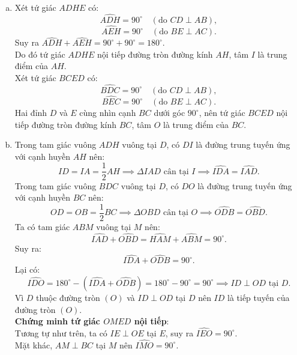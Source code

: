 \begin{bt}
{\begin{center}
	\end{center}
	\begin{enumerate}[a)]
		\item Xét tứ giác $ADHE$ có:
		$$\widehat{ADH} = 90^\circ \quad (\text{do } CD \perp AB),$$
		$$\widehat{AEH} = 90^\circ \quad (\text{do } BE \perp AC).$$
		Suy ra $\widehat{ADH} + \widehat{AEH} = 90^\circ + 90^\circ = 180^\circ$.\\
		Do đó tứ giác $ADHE$ nội tiếp đường tròn đường kính $AH$, tâm $I$ là trung điểm của $AH$.\\
		Xét tứ giác $BCED$ có:
		$$\widehat{BDC} = 90^\circ \quad (\text{do } CD \perp AB),$$
		$$\widehat{BEC} = 90^\circ \quad (\text{do } BE \perp AC).$$
		Hai đỉnh $D$ và $E$ cùng nhìn cạnh $BC$ dưới góc $90^\circ$, nên tứ giác $BCED$ nội tiếp đường tròn đường kính $BC$, tâm $O$ là trung điểm của $BC$.
		\item Trong tam giác vuông $ADH$ vuông tại $D$, có $DI$ là đường trung tuyến ứng với cạnh huyền $AH$ nên:
		$$ID = IA = \frac{1}{2}AH \implies \Delta IAD \text{ cân tại } I \implies \widehat{IDA} = \widehat{IAD}.$$
		Trong tam giác vuông $BDC$ vuông tại $D$, có $DO$ là đường trung tuyến ứng với cạnh huyền $BC$ nên:
		$$OD = OB = \frac{1}{2}BC \implies \Delta OBD \text{ cân tại } O \implies \widehat{ODB} = \widehat{OBD}.$$
		Ta có tam giác $ABM$ vuông tại $M$ nên:
		$$\widehat{IAD} + \widehat{OBD} = \widehat{HAM} + \widehat{ABM} = 90^\circ.$$
		Suy ra:
		$$\widehat{IDA} + \widehat{ODB} = 90^\circ.$$
		Lại có:
		$$\widehat{IDO} = 180^\circ - (\widehat{IDA} + \widehat{ODB}) = 180^\circ - 90^\circ = 90^\circ \implies ID \perp OD \text{ tại } D.$$
		Vì $D$ thuộc đường tròn $(O)$ và $ID \perp OD$ tại $D$ nên $ID$ là tiếp tuyến của đường tròn $(O)$.\\
		\textbf{Chứng minh tứ giác $OMED$ nội tiếp}:\\
		Tương tự như trên, ta có $IE \perp OE$ tại $E$, suy ra $\widehat{IEO} = 90^\circ$.\\
		Mặt khác, $AM \perp BC$ tại $M$ nên $\widehat{IMO} = 90^\circ$.\\

\end{enumerate}}
\end{bt}
